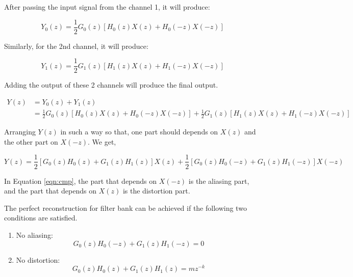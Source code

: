 After passing the input signal from the channel 1, it will produce:

\begin{equation} \label{eqn_wavelet_transform}
{Y_{0}(z) = \frac{1}{2}G_{0}(z)[H_{0}(z)X(z) + H_{0}(-z)X(-z)]}
\end{equation}

Similarly, for the 2nd channel, it will produce:


\begin{equation} \label{eqn_wavelet_transform}
{Y_{1}(z) = \frac{1}{2}G_{1}(z)[H_{1}(z)X(z) + H_{1}(-z)X(-z)]}
\end{equation}

Adding the output of these 2 channels will produce the final output.



\begin{equation} \label{eq1}
\begin{split}
Y(z)  &= Y_{0}(z) + Y_{1}(z) \\
&= \frac{1}{2}G_{0}(z)[H_{0}(z)X(z) + H_{0}(-z)X(-z)] + \frac{1}{2}G_{1}(z)[H_{1}(z)X(z) + H_{1}(-z)X(-z)]
\end{split}
\end{equation}


Arranging $Y(z)$ in such a way so that, one part should depends on $X(z)$ and the other part on $X(-z)$. We get,

\begin{equation} \label{eqn:cmp}
{Y(z) = \frac{1}{2}[G_{0}(z)H_{0}(z) + G_{1}(z)H_{1}(z)]X(z) + \frac{1}{2}[G_{0}(z)H_{0}(-z) + G_{1}(z)H_{1}(-z)]X(-z)}
\end{equation}

In Equation \ref{eqn:cmp}, the part that depends on $X(-z)$ is the aliasing part, and the part that depends on $X(z)$ is the distortion part.



The perfect reconstruction for filter bank can be achieved if the following two conditions are satisfied.

\begin{enumerate}
	\item No aliasing: 
	\begin{equation} \label{eqn:noalias}
	{G_{0}(z)H_{0}(-z) + G_{1}(z)H_{1}(-z) = 0}
	\end{equation}
	\item No distortion:
	\begin{equation} \label{eqn:nodistor}
	{G_{0}(z)H_{0}(z) + G_{1}(z)H_{1}(z) = mz^{-k}}
	\end{equation}
\end{enumerate}


